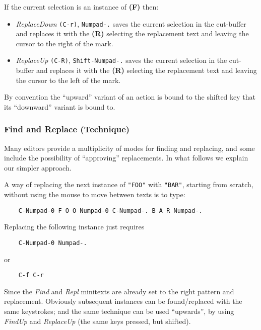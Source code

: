 \documentclass[11pt,a4paper]{article}
\begin{document}
If the current selection is an instance of \textbf{(F)} then:

\begin{itemize}
\item
  \emph{ReplaceDown} \texttt{(C-r)}, \texttt{Numpad-.} saves the current
  selection in the cut-buffer and replaces it with the \textbf{(R)}
  selecting the replacement text and leaving the cursor to the right of
  the mark.
\item
  \emph{ReplaceUp} \texttt{(C-R)}, \texttt{Shift-Numpad-.} saves the
  current selection in the cut-buffer and replaces it with the
  \textbf{(R)} selecting the replacement text and leaving the cursor to
  the left of the mark.
\end{itemize}

By convention the ``upward'' variant of an action is bound to the
shifted key that its ``downward'' variant is bound to.

\hypertarget{find-and-replace-technique}{%
\subsubsection{Find and Replace
(Technique)}\label{find-and-replace-technique}}

Many editors provide a multiplicity of modes for finding and replacing,
and some include the possibility of ``approving'' replacements. In what
follows we explain our simpler approach.

A way of replacing the next instance of \texttt{"FOO"} with
\texttt{"BAR"}, starting from scratch, without using the mouse to
move between texts is to type:

\begin{verbatim}
    C-Numpad-0 F O O Numpad-0 C-Numpad-. B A R Numpad-.
\end{verbatim}

Replacing the following instance just requires

\begin{verbatim}
    C-Numpad-0 Numpad-.
\end{verbatim}

or

\begin{verbatim}
    C-f C-r
\end{verbatim}

Since the \emph{Find} and \emph{Repl} minitexts are already set to
the right pattern and replacement. Obviously subsequent instances
can be found/replaced with the same keystrokes; and the same technique
can be used ``upwards'', by using \emph{FindUp} and \emph{ReplaceUp}
(the same keys pressed, but shifted).
\end{document}
